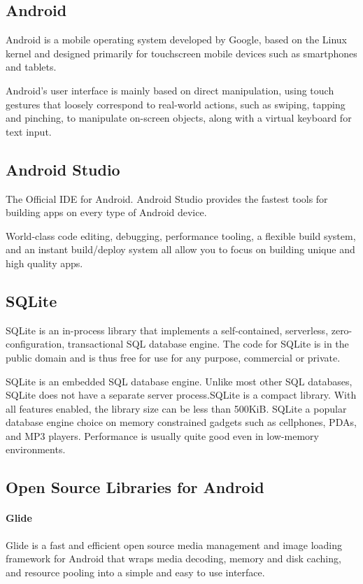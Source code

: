 \documentclass[BTech]{srmuthesis}
\begin{document}
\subsection{Android}
Android is a mobile operating system developed by Google, based on the Linux kernel and designed primarily for touchscreen mobile devices such as smartphones and tablets.

Android's user interface is mainly based on direct manipulation, using touch gestures that loosely correspond to real-world actions, such as swiping, tapping and pinching, to manipulate on-screen objects, along with a virtual keyboard for text input. 
\subsection{Android Studio}
The Official IDE for Android. Android Studio provides the fastest tools for building apps on every type of Android device.

World-class code editing, debugging, performance tooling, a flexible build system, and an instant build/deploy system all allow you to focus on building unique and high quality apps.
\subsection{SQLite}
SQLite is an in-process library that implements a self-contained, serverless, zero-configuration, transactional \ac{SQL} database engine. The code for SQLite is in the public domain and is thus free for use for any purpose, commercial or private.

SQLite is an embedded \ac{SQL} database engine. Unlike most other \ac{SQL} databases, SQLite does not have a separate server process.SQLite is a compact library. With all features enabled, the library size can be less than 500KiB. SQLite a popular database engine choice on memory constrained gadgets such as cellphones, PDAs, and MP3 players. Performance is usually quite good even in low-memory environments.

\subsection{Open Source Libraries for Android}
\paragraph{Glide}
Glide is a fast and efficient open source media management and image loading framework for Android that wraps media decoding, memory and disk caching, and resource pooling into a simple and easy to use interface.
\end{document}
